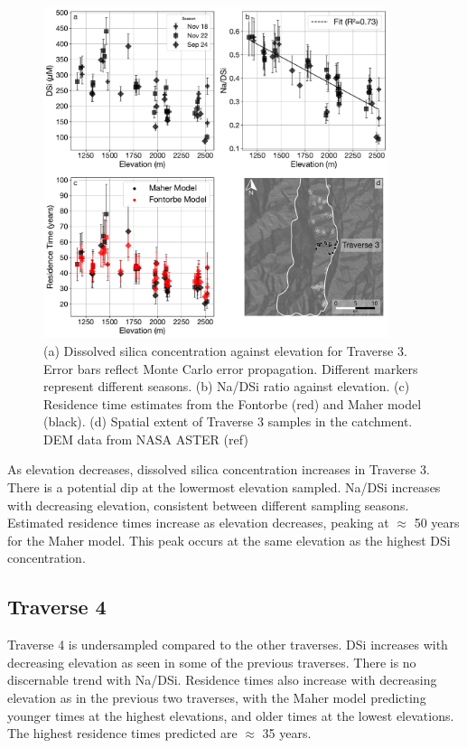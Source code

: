 \begin{figure}[h]
    \centering
        \includegraphics[width=0.9\textwidth]{Traverse_3_summary.pdf}
    \caption{(a) Dissolved silica concentration against elevation for Traverse 3. Error bars reflect Monte Carlo error propagation. Different markers represent different seasons. (b) Na/DSi ratio against elevation. (c) Residence time estimates from the Fontorbe (red) and Maher model (black). (d) Spatial extent of Traverse 3 samples in the catchment. DEM data from NASA ASTER (ref)}
    \label{fig:trav3}
\end{figure}

\FloatBarrier
As elevation decreases, dissolved silica concentration increases in Traverse 3. There is a potential dip at the lowermost elevation sampled. Na/DSi increases with decreasing elevation, consistent between different sampling seasons. Estimated residence times increase as elevation decreases, peaking at $\approx$ 50 years for the Maher model. This peak occurs at the same elevation as the highest DSi concentration.



\subsection{Traverse 4}

Traverse 4 is undersampled compared to the other traverses. DSi increases with decreasing elevation as seen in some of the previous traverses. There is no discernable trend with Na/DSi. Residence times also increase with decreasing elevation as in the previous two traverses, with the Maher model predicting younger times at the highest elevations, and older times at the lowest elevations. The highest residence times predicted are $\approx$ 35 years.

